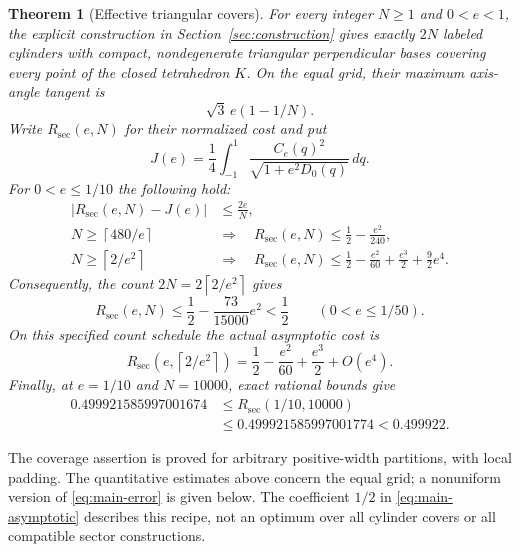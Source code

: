 \documentclass[11pt]{amsart}
\newtheorem{theorem}{Theorem}[section]
\theoremstyle{definition}
\theoremstyle{remark}
\newcommand{\ceil}[1]{\left\lceil#1\right\rceil}
\newcommand{\Rsec}{R_{\mathrm{sec}}}
\begin{document}
\begin{theorem}[Effective triangular covers]\label{thm:main}
For every integer $N\ge1$ and $0<e<1$, the explicit construction in
Section~\ref{sec:construction} gives exactly $2N$ labeled cylinders with
compact, nondegenerate triangular perpendicular bases covering every point
of the closed tetrahedron $K$. On the equal grid, their maximum axis-angle
tangent is
\begin{equation}\label{eq:angle-main}
 \sqrt3\,e(1-1/N).
\end{equation}
Write $\Rsec(e,N)$ for their normalized cost and put
\begin{equation}\label{eq:J}
 J(e)=\frac14\int_{-1}^1
       \frac{C_e(q)^2}{\sqrt{1+e^2D_0(q)}}\,dq.
\end{equation}
For $0<e\le1/10$ the following hold:
\begin{align}
 |\Rsec(e,N)-J(e)|&\le\frac{2e}{N},\label{eq:main-error}\\
 N\ge\ceil{480/e}\quad&\Longrightarrow\quad
 \Rsec(e,N)\le\frac12-\frac{e^2}{240},\label{eq:main-count}\\
 N\ge\ceil{2/e^2}\quad&\Longrightarrow\quad
 \Rsec(e,N)\le\frac12-\frac{e^2}{60}
                         +\frac{e^3}{2}+\frac92e^4.
 \label{eq:main-schedule}
\end{align}
Consequently, the count $2N=2\ceil{2/e^2}$ gives
\begin{equation}\label{eq:main-saving}
 \Rsec(e,N)\le\frac12-\frac{73}{15000}e^2<\frac12
 \qquad(0<e\le1/50).
\end{equation}
On this specified count schedule the actual asymptotic cost is
\begin{equation}\label{eq:main-asymptotic}
 \Rsec(e,\ceil{2/e^2})
 =\frac12-\frac{e^2}{60}+\frac{e^3}{2}+O(e^4).
\end{equation}
Finally, at $e=1/10$ and $N=10000$, exact rational bounds give
\begin{equation}\label{eq:benchmark}
\begin{split}
 0.499921585997001674
 &\le\Rsec(1/10,10000)\\
 &\le0.499921585997001774<0.499922.
\end{split}
\end{equation}
\end{theorem}

The coverage assertion is proved for arbitrary positive-width partitions,
with local padding. The quantitative estimates above concern the equal grid;
a nonuniform version of \eqref{eq:main-error} is given below. The coefficient
$1/2$ in \eqref{eq:main-asymptotic} describes this recipe, not an optimum
over all cylinder covers or all compatible sector constructions.
\end{document}
